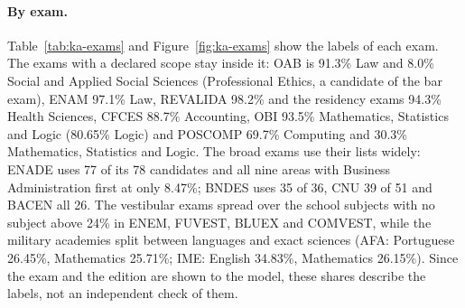 \paragraph{By exam.} Table~\ref{tab:ka-exams} and Figure~\ref{fig:ka-exams}
show the labels of each exam. The exams with a declared scope stay inside it:
OAB is 91.3\% Law and 8.0\% Social and Applied Social Sciences (Professional
Ethics, a candidate of the bar exam), ENAM 97.1\% Law, REVALIDA 98.2\% and the
residency exams 94.3\% Health Sciences, CFCES 88.7\% Accounting, OBI 93.5\%
Mathematics, Statistics and Logic (80.65\% Logic) and POSCOMP 69.7\%
Computing and 30.3\% Mathematics, Statistics and Logic. The broad exams use
their lists widely: ENADE uses 77 of its 78 candidates and all nine areas
with Business Administration first at only 8.47\%; BNDES uses 35 of 36, CNU
39 of 51 and BACEN all 26. The vestibular exams spread over the school
subjects with no subject above 24\% in ENEM, FUVEST, BLUEX and COMVEST, while
the military academies split between languages and exact sciences (AFA:
Portuguese 26.45\%, Mathematics 25.71\%; IME: English 34.83\%, Mathematics
26.15\%). Since the exam and the edition are shown to the model, these
shares describe the labels, not an independent check of them.

